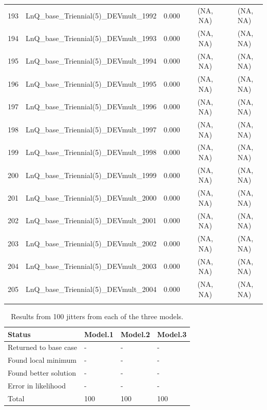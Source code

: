 \documentclass[12pt,]{article}
\begin{document}
\begin{landscape}
\begin{longtable}{rlrrcccl}
  193 & LnQ\_base\_Triennial(5)\_DEVmult\_1992 & 0.000 &  & (NA, NA) &  &  &  (NA, NA) \\ 
  194 & LnQ\_base\_Triennial(5)\_DEVmult\_1993 & 0.000 &  & (NA, NA) &  &  &  (NA, NA) \\ 
  195 & LnQ\_base\_Triennial(5)\_DEVmult\_1994 & 0.000 &  & (NA, NA) &  &  &  (NA, NA) \\ 
  196 & LnQ\_base\_Triennial(5)\_DEVmult\_1995 & 0.000 &  & (NA, NA) &  &  &  (NA, NA) \\ 
  197 & LnQ\_base\_Triennial(5)\_DEVmult\_1996 & 0.000 &  & (NA, NA) &  &  &  (NA, NA) \\ 
  198 & LnQ\_base\_Triennial(5)\_DEVmult\_1997 & 0.000 &  & (NA, NA) &  &  &  (NA, NA) \\ 
  199 & LnQ\_base\_Triennial(5)\_DEVmult\_1998 & 0.000 &  & (NA, NA) &  &  &  (NA, NA) \\ 
  200 & LnQ\_base\_Triennial(5)\_DEVmult\_1999 & 0.000 &  & (NA, NA) &  &  &  (NA, NA) \\ 
  201 & LnQ\_base\_Triennial(5)\_DEVmult\_2000 & 0.000 &  & (NA, NA) &  &  &  (NA, NA) \\ 
  202 & LnQ\_base\_Triennial(5)\_DEVmult\_2001 & 0.000 &  & (NA, NA) &  &  &  (NA, NA) \\ 
  203 & LnQ\_base\_Triennial(5)\_DEVmult\_2002 & 0.000 &  & (NA, NA) &  &  &  (NA, NA) \\ 
  204 & LnQ\_base\_Triennial(5)\_DEVmult\_2003 & 0.000 &  & (NA, NA) &  &  &  (NA, NA) \\ 
  205 & LnQ\_base\_Triennial(5)\_DEVmult\_2004 & 0.000 &  & (NA, NA) &  &  &  (NA, NA) \\ 
   \hline
\hline
\label{tab:model_params}
\end{longtable}
\end{landscape}

\newpage

\begin{table}[ht]
\centering
\caption{Results from 100 jitters from each of 
                                      the three models.} 
\label{tab:jitter}
\begin{tabular}{llll}
  \hline
Status & Model.1 & Model.2 & Model.3 \\ 
  \hline
Returned to base case & - & - & - \\ 
  Found local minimum & - & - & - \\ 
  Found better solution & - & - & - \\ 
  Error in likelihood & - & - & - \\ 
  Total & 100 & 100 & 100 \\ 
   \hline
\end{tabular}
\end{table}
\end{document}
